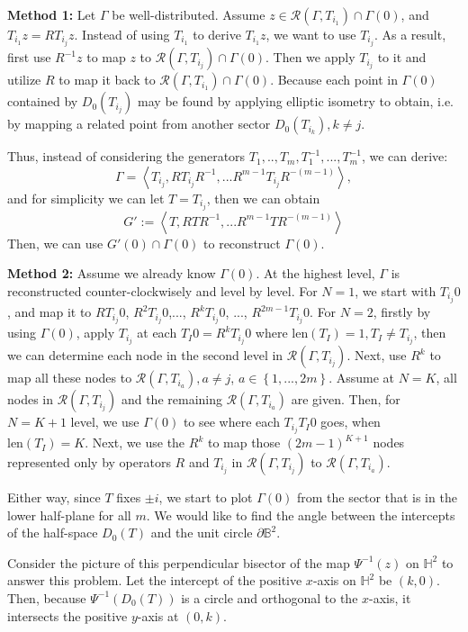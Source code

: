 \documentclass[12pt,oneside]{sfsuthesis}
\theoremstyle{plain} %
\theoremstyle{definition}  %
\theoremstyle{remark}  %
\theoremstyle{plain}
\begin{document}
{\noindent\textbf{Method 1:}  Let $\Gamma$ be well-distributed. Assume $z\in\mathcal{R}(\Gamma,T_{i_1})\cap \Gamma(0)$, and $T_{i_1}z=RT_{i_j}z$. Instead of using $T_{i_1}$ to derive $T_{i_1}z$, we want to use $T_{i_j}$. As a result, first use $R^{-1}z$ to map $z$ to $\mathcal{R}(\Gamma,T_{i_j})\cap \Gamma(0)$. Then we apply $T_{i_j}$ to it and utilize $R$ to map it back to $\mathcal{R}(\Gamma,T_{i_1})\cap \Gamma(0)$. Because each point in $\Gamma(0)$ contained by $D_0(T_{i_j})$ may be found by applying elliptic isometry to obtain, i.e. by mapping a related point from another sector $D_0(T_{i_k}), k\neq j$.



Thus, instead of considering the generators $T_1,..,T_m,T_1^{-1},...,T_m^{-1}$, we can derive:
$$
\Gamma=\left\langle T_{i_j}, RT_{i_j}R^{-1},...R^{m-1}T_{i_j}R^{-(m-1)} \right\rangle,
$$
and for simplicity we can let $T=T_{i_j}$, then we can obtain
$$
G':=\left\langle T, RTR^{-1},...R^{m-1}TR^{-(m-1)} \right\rangle
$$
Then, we can use $G'(0)\cap \Gamma(0)$ to reconstruct $\Gamma(0)$.




\noindent\textbf{Method 2:} Assume we already know $\Gamma(0)$. At the highest level, $\Gamma$ is reconstructed counter-clockwisely and level by level. For $N=1$, we start with $T_{i_j}0$, and map it to $RT_{i_j}0$, $R^2T_{i_j}0$,..., $R^kT_{i_j}0$, ..., $R^{2m-1}T_{i_j}0$. For $N=2$, firstly by using $\Gamma(0)$, apply $T_{i_j}$ at each $T_I0=R^kT_{i_j}0$ where $\text{len}(T_I)=1, T_I\neq T_{i_j}$, then we can determine each node in the second level in $\mathcal{R}(\Gamma,T_{i_j})$. Next, use $R^k$ to map all these nodes to $\mathcal{R}(\Gamma,T_{i_a}), a\neq j$, $a\in\left\lbrace 1,...,2m \right\rbrace$. Assume at $N=K$, all nodes in $\mathcal{R}(\Gamma,T_{i_j})$ and the remaining $\mathcal{R}(\Gamma,T_{i_a})$ are given. Then, for $N=K+1$ level, we use $\Gamma(0)$ to see where each $T_{i_j}T_I0$ goes, when $\text{len}(T_I)=K$. Next, we use the $R^k$ to map those $(2m-1)^{K+1}$ nodes represented only by operators $R$ and $T_{i_j}$ in $\mathcal{R}(\Gamma,T_{i_j})$ to $\mathcal{R}(\Gamma,T_{i_a})$. 


Either way, since $T$ fixes $\pm i$, we start to plot $\Gamma(0)$ from the sector that is in the lower half-plane for all $m$. We would like to find the angle between the intercepts of the half-space $D_{0}(T)$ and the unit circle $\partial\mathbb{B}^2$.


Consider the picture of this perpendicular bisector of the map $\Psi^{-1}(z)$ on $\mathbb{H}^2$ to answer this problem. Let the intercept of the positive $x$-axis on $\mathbb{H}^2$ be $(k,0)$. Then, because $\Psi^{-1} (D_0(T))$ is a circle and orthogonal to the $x$-axis, it intersects the positive $y$-axis at $(0,k)$.

}
\end{document}
